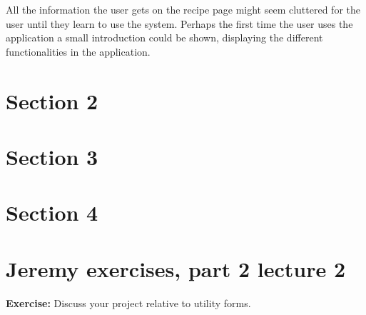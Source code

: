 All the information the user gets on the recipe page might seem cluttered for the user until they learn to use the system. Perhaps the first time the user uses the application a small introduction could be shown, displaying the different functionalities in the application.



\section*{Section 2}



\section*{Section 3}


\section*{Section 4}


\section*{Jeremy exercises, part 2 lecture 2}

\textbf{Exercise:} Discuss your project relative to utility forms.

